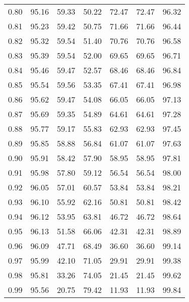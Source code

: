 \begin{tabular}{|c|c|c|c|c|c|c|}
      0.80 &     95.16 &     59.33 &      50.22 &   72.47 &      72.47 &         96.32 \\
      0.81 &     95.23 &     59.42 &      50.75 &   71.66 &      71.66 &         96.44 \\
      0.82 &     95.32 &     59.54 &      51.40 &   70.76 &      70.76 &         96.58 \\
      0.83 &     95.39 &     59.54 &      52.00 &   69.65 &      69.65 &         96.71 \\
      0.84 &     95.46 &     59.47 &      52.57 &   68.46 &      68.46 &         96.84 \\
      0.85 &     95.54 &     59.56 &      53.35 &   67.41 &      67.41 &         96.98 \\
      0.86 &     95.62 &     59.47 &      54.08 &   66.05 &      66.05 &         97.13 \\
      0.87 &     95.69 &     59.35 &      54.89 &   64.61 &      64.61 &         97.28 \\
      0.88 &     95.77 &     59.17 &      55.83 &   62.93 &      62.93 &         97.45 \\
      0.89 &     95.85 &     58.88 &      56.84 &   61.07 &      61.07 &         97.63 \\
      0.90 &     95.91 &     58.42 &      57.90 &   58.95 &      58.95 &         97.81 \\
      0.91 &     95.98 &     57.80 &      59.12 &   56.54 &      56.54 &         98.00 \\
      0.92 &     96.05 &     57.01 &      60.57 &   53.84 &      53.84 &         98.21 \\
      0.93 &     96.10 &     55.92 &      62.16 &   50.81 &      50.81 &         98.42 \\
      0.94 &     96.12 &     53.95 &      63.81 &   46.72 &      46.72 &         98.64 \\
      0.95 &     96.13 &     51.58 &      66.06 &   42.31 &      42.31 &         98.89 \\
      0.96 &     96.09 &     47.71 &      68.49 &   36.60 &      36.60 &         99.14 \\
      0.97 &     95.99 &     42.10 &      71.05 &   29.91 &      29.91 &         99.38 \\
      0.98 &     95.81 &     33.26 &      74.05 &   21.45 &      21.45 &         99.62 \\
      0.99 &     95.56 &     20.75 &      79.42 &   11.93 &      11.93 &         99.84 \\
\bottomrule
\end{tabular}
